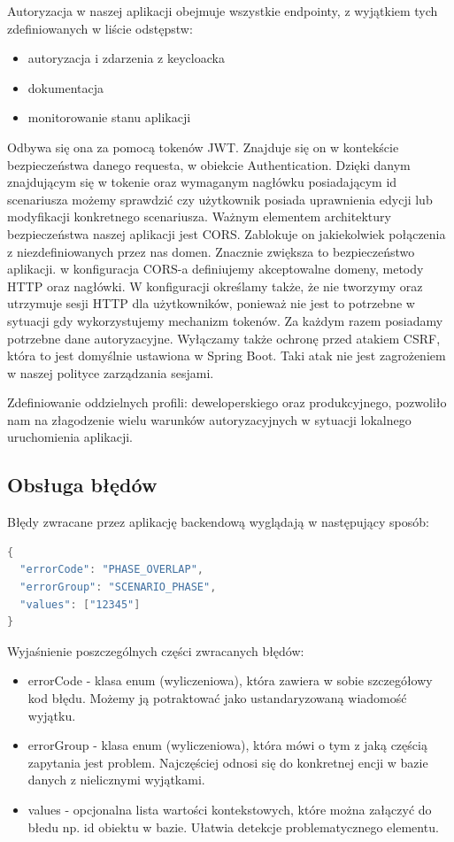 Autoryzacja w naszej aplikacji obejmuje wszystkie endpointy, z wyjątkiem tych zdefiniowanych w liście odstępstw:
\begin{itemize}
    \item autoryzacja i zdarzenia z keycloacka
    \item dokumentacja
    \item monitorowanie stanu aplikacji
\end{itemize}
Odbywa się ona za pomocą tokenów JWT. Znajduje się on w kontekście bezpieczeństwa danego requesta, w obiekcie Authentication.
Dzięki danym znajdującym się w tokenie oraz wymaganym nagłówku posiadającym id scenariusza możemy sprawdzić czy użytkownik posiada uprawnienia edycji 
lub modyfikacji konkretnego scenariusza. Ważnym elementem architektury bezpieczeństwa naszej aplikacji jest CORS. 
Zablokuje on jakiekolwiek połączenia z niezdefiniowanych przez nas domen. Znacznie zwiększa to bezpieczeństwo aplikacji. 
w konfiguracja CORS-a definiujemy akceptowalne domeny, metody HTTP oraz nagłówki. W konfiguracji określamy także, że 
nie tworzymy oraz utrzymuje sesji HTTP dla użytkowników, ponieważ nie jest to potrzebne w sytuacji gdy wykorzystujemy mechanizm
tokenów. Za każdym razem posiadamy potrzebne dane autoryzacyjne. Wyłączamy także ochronę przed atakiem CSRF, która to jest domyślnie 
ustawiona w Spring Boot. Taki atak nie jest zagrożeniem w naszej polityce zarządzania sesjami.

Zdefiniowanie oddzielnych profili: deweloperskiego oraz produkcyjnego, pozwoliło nam na złagodzenie wielu warunków autoryzacyjnych
w sytuacji lokalnego uruchomienia aplikacji. 

\subsection{Obsługa błędów}

Błędy zwracane przez aplikację backendową wyglądają w następujący sposób:

\begin{lstlisting}[language=Java]
{
  "errorCode": "PHASE_OVERLAP",
  "errorGroup": "SCENARIO_PHASE",
  "values": ["12345"]
}
\end{lstlisting}

Wyjaśnienie poszczególnych części zwracanych błędów:
\begin{itemize}
    \item errorCode - klasa enum (wyliczeniowa), która zawiera w sobie szczegółowy kod błędu. Możemy ją potraktować jako
    ustandaryzowaną wiadomość wyjątku.
    \item errorGroup - klasa enum (wyliczeniowa), która mówi o tym z jaką częścią zapytania jest problem. Najczęściej odnosi się
    do konkretnej encji w bazie danych z nielicznymi wyjątkami.
    \item values - opcjonalna lista wartości kontekstowych, które można załączyć do błedu np. id obiektu w bazie. Ułatwia detekcje 
    problematycznego elementu.
\end{itemize}

